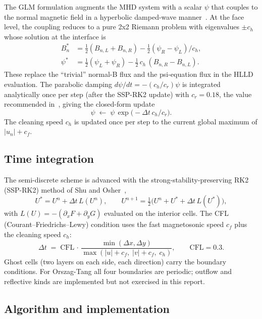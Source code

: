 \documentclass[11pt]{article}
\begin{document}
The GLM formulation augments the MHD system with a scalar $\psi$ that couples to the normal magnetic field in a hyperbolic damped-wave manner~\cite{dedner2002}.  At the face level, the coupling reduces to a pure 2x2 Riemann problem with eigenvalues $\pm c_h$ whose solution at the interface is
\begin{align}
  B^{*}_{n}  &= \tfrac{1}{2}(B_{n,L} + B_{n,R})
               - \tfrac{1}{2}(\psi_R - \psi_L)/c_h,\\
  \psi^{*}   &= \tfrac{1}{2}(\psi_L + \psi_R)
               - \tfrac{1}{2}\,c_h\,(B_{n,R} - B_{n,L}).
\end{align}
These replace the ``trivial'' normal-B flux and the psi-equation flux in the HLLD evaluation.  The parabolic damping $d\psi/dt = -(c_h/c_r)\psi$ is integrated analytically once per step (after the SSP-RK2 update) with $c_r = 0.18$, the value recommended in~\cite{dedner2002}, giving the closed-form update
\begin{equation}
\psi \;\leftarrow\; \psi\,\exp\!\bigl(-\Delta t\,c_h / c_r\bigr).
\label{eq:psi-damp}
\end{equation}
The cleaning speed $c_h$ is updated once per step to the current global maximum of $|u_n| + c_f$.

\subsection{Time integration}

The semi-discrete scheme is advanced with the strong-stability-preserving RK2 (SSP-RK2) method of Shu and Osher~\cite{shu1988},
\begin{equation}
U^{*} = U^{n} + \Delta t\,L(U^{n}),
\qquad
U^{n+1} = \tfrac{1}{2}\bigl(U^{n} + U^{*} + \Delta t\,L(U^{*})\bigr),
\end{equation}
with $L(U) = -(\partial_x F + \partial_y G)$ evaluated on the interior cells.  The CFL (Courant--Friedrichs--Lewy) condition uses the fast magnetosonic speed $c_f$ plus the cleaning speed $c_h$:
\begin{equation}
\Delta t \;=\; \mathrm{CFL}\,\cdot\,
  \frac{\min(\Delta x, \Delta y)}
       {\max(|u|+c_f,\;|v|+c_f,\;c_h)},
\qquad \mathrm{CFL}=0.3.
\end{equation}
Ghost cells (two layers on each side, each direction) carry the boundary conditions.  For Orszag-Tang all four boundaries are periodic; outflow and reflective kinds are implemented but not exercised in this report.

\subsection{Algorithm and implementation}
\end{document}
